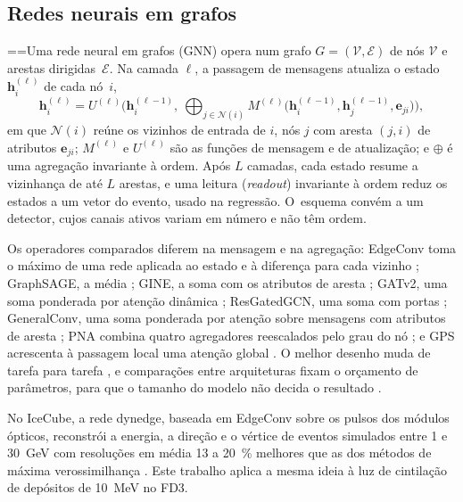\subsection{Redes neurais em grafos}
\label{sec:rev_gnn}

{ \abovedisplayshortskip=\abovedisplayskip \belowdisplayshortskip=\belowdisplayskip Uma rede neural em grafos (GNN) opera num grafo $G = (\mathcal{V}, \mathcal{E})$ de nós $\mathcal{V}$ e arestas dirigidas~$\mathcal{E}$. Na camada $\ell$, a passagem de mensagens \cite{gilmer2017neural} atualiza o estado~$\mathbf{h}_i^{(\ell)}$ de cada nó~$i$,
\begin{equation}
  \mathbf{h}_i^{(\ell)} = U^{(\ell)}\Big(\mathbf{h}_i^{(\ell-1)},\ \bigoplus_{j \in \mathcal{N}(i)} M^{(\ell)}\big(\mathbf{h}_i^{(\ell-1)}, \mathbf{h}_j^{(\ell-1)}, \mathbf{e}_{ji}\big)\Big),
  \label{eq:mensagens}
\end{equation}
em que $\mathcal{N}(i)$ reúne os vizinhos de entrada de $i$, nós $j$ com aresta $(j, i)$ de atributos $\mathbf{e}_{ji}$; $M^{(\ell)}$ e $U^{(\ell)}$ são as funções de mensagem e de atualização; e $\oplus$ é uma agregação invariante à ordem. Após $L$ camadas, cada estado resume a vizinhança de até $L$ arestas, e uma leitura (\textit{readout}) invariante à ordem reduz os estados a um vetor do evento, usado na regressão. O~esquema convém a um detector, cujos canais ativos variam em número e não têm ordem.\par}

Os operadores comparados diferem na mensagem e na agregação: EdgeConv toma o máximo de uma rede aplicada ao estado e à diferença para cada vizinho \cite{wang2019dynamic}; GraphSAGE, a média \cite{hamilton2017inductive}; GINE, a soma com os atributos de aresta \cite{hu2020strategies}; GATv2, uma soma ponderada por atenção dinâmica \cite{brody2022how}; ResGatedGCN, uma soma com portas \cite{bresson2017residual}; GeneralConv, uma soma ponderada por atenção sobre mensagens com atributos de aresta \cite{you2020design}; PNA combina quatro agregadores reescalados pelo grau do nó \cite{corso2020principal}; e GPS acrescenta à passagem local uma atenção global \cite{rampasek2022recipe}. O melhor desenho muda de tarefa para tarefa \cite{you2020design}, e comparações entre arquiteturas fixam o orçamento de parâmetros, para que o tamanho do modelo não decida o resultado \cite{dwivedi2023benchmarking}.

No IceCube, a rede dynedge, baseada em EdgeConv sobre os pulsos dos módulos ópticos, reconstrói a energia, a direção e o vértice de eventos simulados entre \num{1} e \qty{30}{\GeV} com resoluções em média \num{13} a \qty{20}{\percent} melhores que as dos métodos de máxima verossimilhança \cite{abbasi2022graph}. Este trabalho aplica a mesma ideia à luz de cintilação de depósitos de \qty{10}{\MeV} no FD3.

